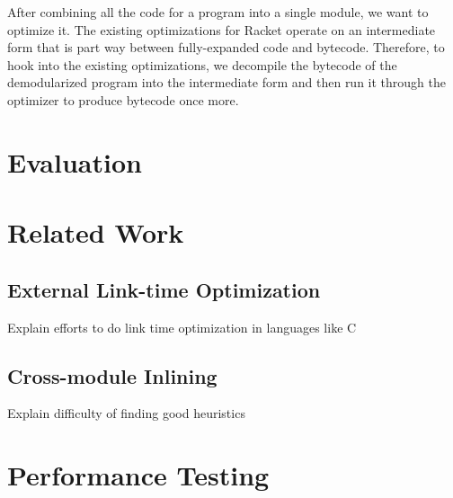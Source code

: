\documentclass{llncs}
\begin{document}
After combining all the code for a program into a single module, we want to optimize it.
The existing optimizations for Racket operate on an intermediate form that is part way between fully-expanded code and bytecode. 
Therefore, to hook into the existing optimizations, we decompile the bytecode of the demodularized program into the intermediate form and then run it through the optimizer to produce bytecode once more.

\section{Evaluation}



\section{Related Work}
   \subsection{External Link-time Optimization}

   Explain efforts to do link time optimization in languages like C 
   
   \subsection{Cross-module Inlining}

   Explain difficulty of finding good heuristics

\section{Performance Testing}
  
\end{document}
